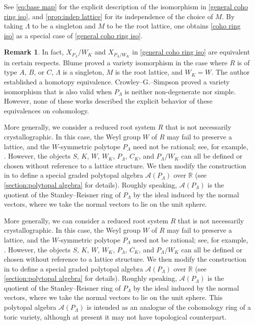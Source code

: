 \documentclass{amsart}
\theoremstyle{plain} \numberwithin{equation}{section}
\theoremstyle{definition}
\newtheorem{remark}[theorem]{Remark}
\newcommand{\R}{\mathbb{R}}
\begin{document}
See \cref{eq:base map} for the explicit description of the isomorphism in \cref{general coho ring iso}, and \cref{prop:indep lattice} for its independence of the choice of $M$.
By taking $\Lambda$ to be a singleton and $M$ to be the root lattice, one obtains \cref{coho ring iso} as a special case of \cref{general coho ring iso}.
\begin{remark}
  In fact, $X_{P_{\Lambda}}/W_K$ and $X_{P_{\Lambda}/W_K}$ in \cref{general coho ring iso} are equivalent in certain respects.
  Blume \cite{blumeToricOrbifoldsAssociated2015} proved a variety isomorphism in the case where $R$ is of type $A$, $B$, or $C$, $\Lambda$ is a singleton, $M$ is the root lattice, and $W_K = W$.
  The author \cite{gongHomotopyTypesToric2024} established a homotopy equivalence.
  Crowley--G.--Simpson \cite{crowleyToricVarietiesModulo2024} proved a variety isomorphism that is also valid when $P_{\Lambda}$ is neither non-degenerate nor simple.
  However, none of these works described the explicit behavior of these equivalences on cohomology.
\end{remark}

More generally, we  consider a reduced root system $R$ that is not necessarily crystallographic. 
In this case, the Weyl group $W$ of $R$ may fail to preserve a lattice, and the $W$-symmetric polytope $P_{\Lambda}$ need not be rational; see, for example, \cite[Proposition 2.8]{humphreysReflectionGroupsCoxeter1992}.
However, the objects $S$, $K$, $W$, $W_K$, $P_{\Lambda}$, $C_K$, and $P_{\Lambda}/W_K$ can all be defined or chosen without reference to a lattice structure.
We then modify the construction in \cite[p.~248]{stembridgePermutationRepresentationsWeyl1994} to define a special graded polytopal algebra $\mathcal{A}(P_{\Lambda})$ over $\R$ (see \cref{section:polytopal algebra} for details).
 Roughly speaking, $\mathcal{A}(P_{\Lambda})$ is the quotient of the Stanley--Reisner ring of $P_{\Lambda}$ by the ideal induced by the normal vectors, where we take the normal vectors to lie on the unit sphere.

More generally, we can consider a reduced root system $R$ that is not necessarily crystallographic. 
In this case, the Weyl group $W$ of $R$ may fail to preserve a lattice, and the $W$-symmetric polytope $P_{\Lambda}$ need not be rational; see, for example, \cite[Proposition 2.8]{humphreysReflectionGroupsCoxeter1992}.
However, the objects $S$, $K$, $W$, $W_K$, $P_{\Lambda}$, $C_K$, and $P_{\Lambda}/W_K$ can all be defined or chosen without reference to a lattice structure.
We then modify the construction in \cite[p.~248]{stembridgePermutationRepresentationsWeyl1994} to define a special graded polytopal algebra $\mathcal{A}(P_{\Lambda})$ over $\R$ (see \cref{section:polytopal algebra} for details).
 Roughly speaking, $\mathcal{A}(P_{\Lambda})$ is the quotient of the Stanley--Reisner ring of $P_{\Lambda}$ by the ideal induced by the normal vectors, where we take the normal vectors to lie on the unit sphere.
This polytopal algebra $\mathcal{A}(P_{\Lambda})$ is intended as an analogue of the cohomology ring of a toric variety, although at present it may not have topological counterpart.
\end{document}
